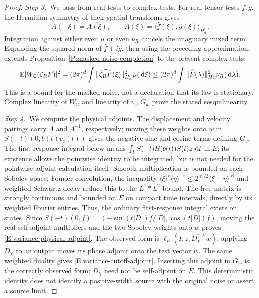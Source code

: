\begin{proof}
  \medskip
  \noindent\textit{Step 3.~}We pass from real tests to complex tests.
  For real tensor tests $f,g$, the Hermitian symmetry of their spatial
  transforms gives
  \[
    A(-\xi) = \overline{A(\xi)},\qquad
    A(\xi) = \langle\widehat{f}(\xi),\widehat{g}(\xi)\rangle_{H_a^{\mathbb{C}}}.
  \]
  Integration against either even $\mu$ or even $\nu_R$ cancels the imaginary
  mixed term. Expanding the squared norm of $\widehat{f}+i\widehat{g}$, then
  using the preceding approximation, extends
  Proposition~\ref{P:masked-noise-completion} to the present complex tests:
  \begin{equation}\label{E:variance-complex-noise}
    \mathbb{E}|W_{\mathbb{C}}(\zeta_RF)|^2
    = (2\pi)^d\int\|\widehat{\zeta_RF}(\xi)\|_{H_a^{\mathbb{C}}}^2\mu(\,\mathrm{d}\xi)
    \le (2\pi)^d\int\|\widehat{F}(\lambda)\|_{H_a^{\mathbb{C}}}^2\nu_R(\,\mathrm{d}\lambda).
  \end{equation}
  This is a bound for the masked noise, not a declaration that its law is
  stationary. Complex linearity of $W_{\mathbb{C}}$ and linearity of $v_z,G_w$
  prove the stated sesquilinearity.

  \medskip
  \noindent\textit{Step 4.~}We compute the physical adjoints.
  The displacement and velocity pairings carry $\Lambda$ and $\Lambda^{-1}$,
  respectively; moving these weights onto $w$ in $S(-t)(0,b(t)v_z(t))$ gives
  the negative sine and cosine terms defining $G_w$.
  The first-response integral below means $\int_I S(-t)B(b(t))S(t)z\,\,\mathrm{d} t$ in
  $E$; its existence allows the pointwise identity to be integrated, but is
  not needed for the pointwise adjoint calculation itself.
  Smooth multiplication is bounded on each Sobolev space: Fourier convolution,
  the inequality $\langle\xi\rangle^r\langle\eta\rangle^{-r} \le
  2^{|r|/2}\langle\xi-\eta\rangle^{|r|}$ and weighted Schwartz decay reduce this
  to the $L^1*L^2$ bound. The free matrix is strongly continuous and bounded on
  $E$ on compact time intervals, directly by its weighted Fourier entries. Thus,
  the ordinary first-response integral exists on states. Since $S(-t)(0,f) =
  (-\sin(t|D|)f/|D|,\cos(t|D|)f)$, moving the real self-adjoint multipliers and
  the two Sobolev weights onto $w$ proves \eqref{E:variance-physical-adjoint}.
  The observed form is $\ell_R(I;z,D_\chi^{*,E}w)$: applying $D_\chi$ to an
  output moves its phase adjoint onto the test vector $w$.
  The same weighted duality gives \eqref{E:variance-cutoff-adjoint}. Inserting
  this adjoint in $G_w$ is the correctly observed form; $D_\chi$ need not be
  self-adjoint on $E$. This deterministic identity does not identify a
  positive-width source with the original noise or assert a source limit.


\end{proof}
